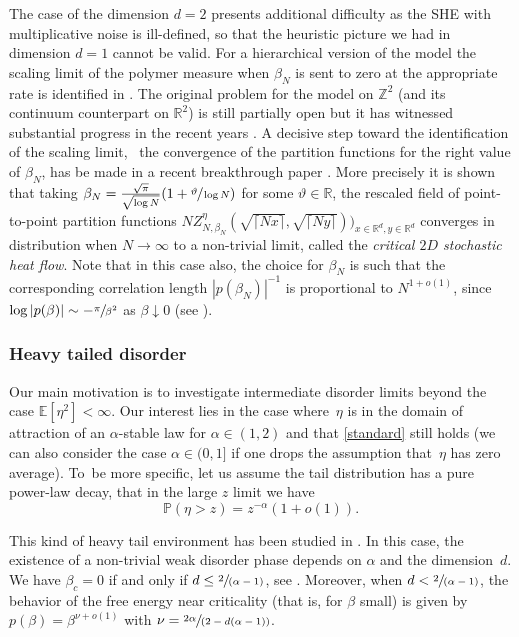 \documentclass[10pt]{amsart}
\newcommand{\spfrac}[2]{\sfrac{#1}{(#2)}}
\theoremstyle{definition}
\newcommand{\bbE}{{\ensuremath{\mathbb E}} }
\newcommand{\bbP}{{\ensuremath{\mathbb P}} }
\newcommand{\bbR}{{\ensuremath{\mathbb R}} }
\newcommand{\bbZ}{{\ensuremath{\mathbb Z}} }
\let\ga\alpha
\let\gb\beta
\begin{document}
The case of the dimension $d=2$ presents additional difficulty as the SHE with multiplicative noise is ill-defined, so that the heuristic picture we had in dimension $d=1$ cannot be valid.
For a hierarchical version of the model
the scaling limit of the polymer measure when $\beta_N$ is sent to zero at the appropriate rate is identified in \cite{clark2019}. The original problem for the model on $\bbZ^2$ (and its continuum counterpart on $\bbR^2$) is still partially open but it has witnessed substantial progress in the recent years \cite{CSZ15, CSZ18scaling, gu2019}. A decisive step toward the identification of the scaling limit, \ie \ the convergence of the partition functions for the right value of $\beta_N$, has be made in a recent breakthrough paper \cite{CSZ21}.
More precisely it is shown that taking
$\beta_N = \frac{\sqrt{\pi}}{\sqrt{\log N}} (1+ \sfrac{\vartheta}{\log N})$ for some $\vartheta\in \bbR$,
the rescaled
field of point-to-point partition functions
$N Z^{\eta}_{N, \beta_N}(\sqrt{\lceil Nx\rceil},\sqrt{\lceil Ny \rceil}))_{x\in \bbR^d, y\in \bbR^d}$ converges in distribution when $N\to \infty$ to a non-trivial limit, called the \emph{critical $2D$ stochastic heat flow}.
Note that in this case also, the choice for $\beta_N$ is such that the corresponding correlation length $|p(\beta_N)|^{-1}$ is proportional to $N^{1+o(1)}$,
since $\log |p(\beta)| \sim - \sfrac{\pi}{\gb^2}$ as $\gb\downarrow0$ (see \cite{BL17}).

\subsubsection*{Heavy tailed disorder}
Our main motivation is to investigate intermediate disorder limits beyond the case $\bbE[ \eta^2]<\infty$.
Our interest lies in the case where~$\eta$ is in the domain of attraction of an $\alpha$-stable law for $\alpha\in (1,2)$ and that \eqref{standard} still holds (we can also consider the case $\alpha\in(0,1]$ if one drops the assumption that~$\eta$ has zero average). To~be more specific, let us assume the tail distribution has a pure power-law decay, \ie that in the large $z$ limit we have
\begin{equation}
\label{def:eta}
\bbP(\eta> z) = z^{-\alpha}(1+o(1)).
\end{equation}

This kind of heavy tail environment has been studied in \cite{Vi19}. In this case, the existence of a non-trivial weak disorder phase depends on $\alpha$ and the dimension~$d$. We have $\gb_c=0$
if and only if $d\leq \spfrac{2}{\ga-1}$,
see \cite[Th.\,1.1]{Vi19}.
Moreover, when $d<\nobreak \spfrac{2}{\alpha-1}$,
the behavior of the free energy near criticality (that is, for $\beta$ small) is given by
$p(\beta)=\beta^{\nu+o(1)}$ with $\nu =\spfrac{2\alpha}{2-d(\alpha-1)}$.
\end{document}
